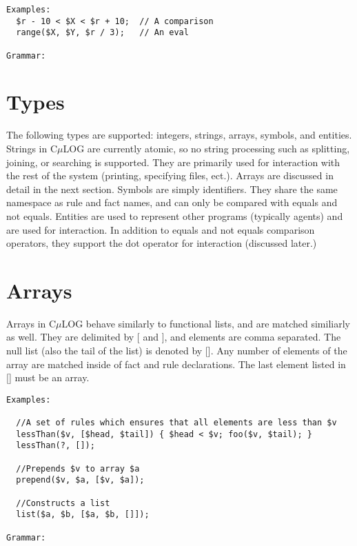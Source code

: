 \documentclass[onecolumn,titlepage]{article}
\begin{document}
\begin{verbatim}
Examples:
  $r - 10 < $X < $r + 10;  // A comparison
  range($X, $Y, $r / 3);   // An eval

Grammar:
\end{verbatim}

\section{Types}
The following types are supported: integers, strings, arrays, symbols, and entities.
Strings in C$\mu$LOG are currently atomic, so no string processing such as splitting,
joining, or searching is supported.  They are primarily used for interaction with the
rest of the system (printing, specifying files, ect.).  Arrays are discussed in detail
in the next section.  Symbols are simply identifiers.  They share the same namespace as rule
and fact names, and can only be compared with equals and not equals.  Entities are used
to represent other programs (typically agents) and are used for interaction.  In addition
to equals and not equals comparison operators, they support the dot operator for interaction
(discussed later.)

\section{Arrays}
Arrays in C$\mu$LOG behave similarly to functional lists, and are matched similiarly as well.
They are delimited by [ and ], and elements are comma separated.  The null list (also the tail
of the list) is denoted by [].  Any number of elements of the array are matched inside of
fact and rule declarations.  The last element listed in [] must be an array.
\begin{verbatim}
Examples:

  //A set of rules which ensures that all elements are less than $v
  lessThan($v, [$head, $tail]) { $head < $v; foo($v, $tail); }
  lessThan(?, []);

  //Prepends $v to array $a
  prepend($v, $a, [$v, $a]);

  //Constructs a list
  list($a, $b, [$a, $b, []]);

Grammar:
\end{verbatim}

\end{document}
